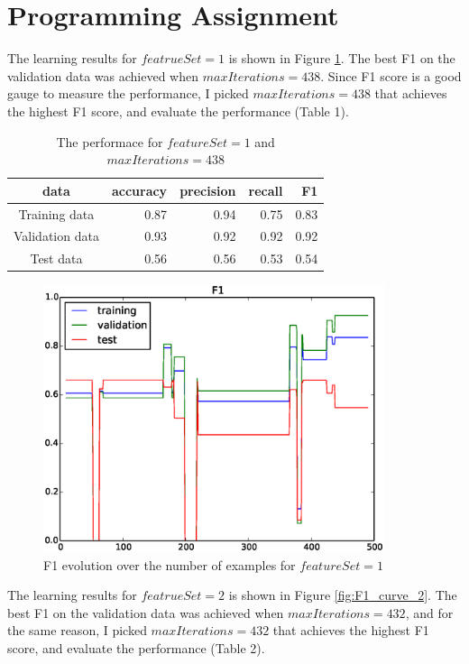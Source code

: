 \section{Programming Assignment}


The learning results for $featrueSet=1$ is shown in Figure \ref{fig:F1_curve_1}.  The best F1 on the validation data was achieved when $maxIterations=438$. Since F1 score is a good gauge to measure the performance, I picked $maxIterations = 438$ that achieves the highest F1 score, and evaluate the performance (Table 1).

\begin{table}[htb]
\centering
  \begin{tabular}{|c|r|r|r|r|} \hline
    data & accuracy & precision & recall & F1 \\ \hline
    Training data & 0.87 & 0.94 & 0.75 & 0.83 \\ \hline
    Validation data & 0.93 & 0.92 & 0.92 & 0.92 \\ \hline
    Test data & 0.56 & 0.56 & 0.53 & 0.54 \\ \hline
  \end{tabular}
  \caption{The performace for $featureSet = 1$ and $maxIterations = 438$}
\end{table}

\begin{figure}[hbtp]
\centering
\includegraphics[width=100mm]{F1_curve_1}
\caption{F1 evolution over the number of examples for $featureSet=1$}
\label{fig:F1_curve_1}
\end{figure}

The learning results for $featrueSet=2$ is shown in Figure \ref{fig:F1_curve_2}. The best F1 on the validation data was achieved when $maxIterations=432$, and for the same reason, I picked $maxIterations = 432$ that achieves the highest F1 score, and evaluate the performance (Table 2).

